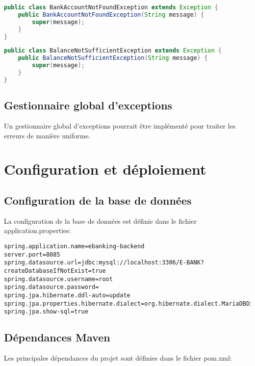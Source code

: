 \documentclass[12pt,a4paper]{report}
\begin{document}
\begin{lstlisting}[language=Java, caption=BankAccountNotFoundException.java]
public class BankAccountNotFoundException extends Exception {
    public BankAccountNotFoundException(String message) {
        super(message);
    }
}
\end{lstlisting}

\begin{lstlisting}[language=Java, caption=BalanceNotSufficientException.java]
public class BalanceNotSufficientException extends Exception {
    public BalanceNotSufficientException(String message) {
        super(message);
    }
}
\end{lstlisting}

\section{Gestionnaire global d'exceptions}
Un gestionnaire global d'exceptions pourrait être implémenté pour traiter les erreurs de manière uniforme.

\chapter{Configuration et déploiement}
\section{Configuration de la base de données}
La configuration de la base de données est définie dans le fichier application.properties:

\begin{lstlisting}[language=properties, caption=application.properties]
spring.application.name=ebanking-backend
server.port=8085
spring.datasource.url=jdbc:mysql://localhost:3306/E-BANK?createDatabaseIfNotExist=true
spring.datasource.username=root
spring.datasource.password=
spring.jpa.hibernate.ddl-auto=update
spring.jpa.properties.hibernate.dialect=org.hibernate.dialect.MariaDBDialect
spring.jpa.show-sql=true
\end{lstlisting}

\section{Dépendances Maven}
Les principales dépendances du projet sont définies dans le fichier pom.xml:
\end{document}

